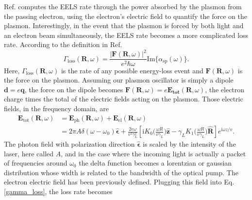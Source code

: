\documentclass [11pt, proquest] {uwthesis}[2016/11/22]
\begin{document}
Ref. \cite{Quillin} computes the EELS rate through the power absorbed by the plasmon from the passing electron, using the electron's electric field to quantify the force on the plasmon. Interestingly, in the event that the plasmon is forced by both light and an electron beam simultaneously, the EELS rate becomes a more complicated loss rate. According to the definition in Ref. \cite{Quillin}
\begin{equation}
\Gamma_{\textrm{loss}}(\textbf{R},\omega) = \frac{|\textbf{F}(\textbf{R},\omega)|^2}{e^2\hbar\omega}\textrm{Im}\{\alpha_{\textrm{sp}}(\omega)\}.
\label{gamma_loss}
\end{equation}
Here, $\Gamma_{\textrm{loss}}(\textbf{R},\omega)$ is the rate of any possible energy-loss event and $\textbf{F}(\textbf{R},\omega)$ is the force on the plasmon. Assuming our plasmon oscillator is simply a dipole $\textbf{d}=e\textbf{q}$, the force on the dipole becomes $\textbf{F}(\textbf{R},\omega) = e\textbf{E}_{\textbf{tot}}(\textbf{R},\omega)$, the electron charge times the total of the electric fields acting on the plasmon. Those electric fields, in the frequency domain, are
\begin{equation}
\begin{aligned}
\textbf{E}_{\textrm{tot}}(\textbf{R},\omega) &= \textbf{E}_{\textrm{ph}}(\textbf{R},\omega) + \textbf{E}_{\textrm{el}}(\textbf{R},\omega)\\
& = 2\pi A\delta(\omega-\omega_0)\hat{\boldsymbol{\epsilon}} + \frac{2e\omega}{v^2\gamma_L^2}\left[ \textrm{i}K_0\big( \frac{\omega R}{v\gamma_L} \big)\hat{\textbf{z}} -  \gamma_L K_1\big( \frac{\omega R}{v\gamma_L} \big)\hat{\textbf{R}}\right]e^{\textrm{i}\omega z/v}.
\label{fields_sum}
\end{aligned}
\end{equation}
The photon field with polarization direction $\hat{\boldsymbol{\epsilon}}$ is scaled by the intensity of the laser, here called $A$, and in the case where the incoming light is actually a packet of frequencies around $\omega_0$ the delta function becomes a lorentzian or gaussian distribution whose width is related to the bandwidth of the optical pump. The electron electric field has been previously defined. Plugging this field into Eq. \ref{gamma_loss}, the loss rate becomes
\end{document}
